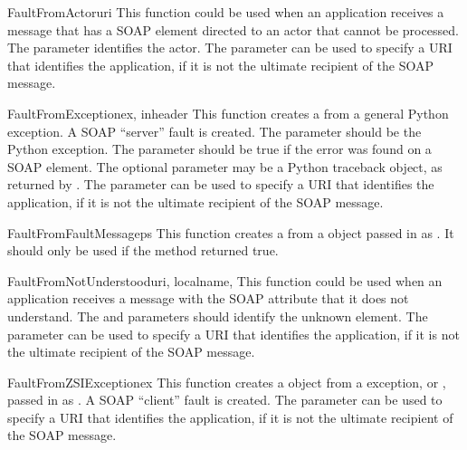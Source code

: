 \begin{funcdesc}{FaultFromActor}{uri}
This function could be used when an application receives a message
that has a SOAP  element directed to an actor that
cannot be processed.
The  parameter identifies the actor.
The  parameter can be used to specify a URI that identifies the
application, if it is not the ultimate recipient of the SOAP message.
\end{funcdesc}

\begin{funcdesc}{FaultFromException}{ex, inheader}
This function creates a  from a general Python exception.
A SOAP ``server'' fault is created.
The  parameter should be the Python exception.
The  parameter should be true if the error was
found on a SOAP  element.
The optional  parameter may be a Python traceback
object, as returned by .
The  parameter can be used to specify a URI that identifies the
application, if it is not the ultimate recipient of the SOAP message.
\end{funcdesc}

\begin{funcdesc}{FaultFromFaultMessage}{ps}
This function creates a  from a  object
passed in as .
It should only be used if the  method returned true.
\end{funcdesc}

\begin{funcdesc}{FaultFromNotUnderstood}{uri, localname,}
This function could be used when an application receives a message with
the SOAP  attribute that it does not understand.
The  and  parameters should identify
the unknown element.
The  parameter can be used to specify a URI that identifies the
application, if it is not the ultimate recipient of the SOAP message.
\end{funcdesc}

\begin{funcdesc}{FaultFromZSIException}{ex}
This function creates a  object from a \ZSI{} exception,
 or , passed in
as .
A SOAP ``client'' fault is created.
The  parameter can be used to specify a URI that identifies the
application, if it is not the ultimate recipient of the SOAP message.
\end{funcdesc}

